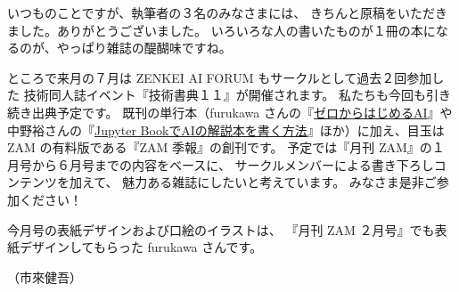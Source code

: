 \documentclass[dvipdfmx,autodetect-engine,10pt,b5paper,papersize,openany,dvipsnames]{jsbook}
\begin{document}
いつものことですが、執筆者の３名のみなさまには、
きちんと原稿をいただきました。ありがとうございました。
いろいろな人の書いたものが１冊の本になるのが、やっぱり雑誌の醍醐味ですね。

\vspace{1em}

ところで来月の７月は ZENKEI AI FORUM もサークルとして過去２回参加した
技術同人誌イベント『技術書典１１』が開催されます。
私たちも今回も引き続き出典予定です。
既刊の単行本（furukawa さんの『\href{https://techbookfest.org/product/6566174659706880}{ゼロからはじめるAI}』や中野裕さんの『\href{https://techbookfest.org/product/5840767786418176}{Jupyter BookでAIの解説本を書く方法}』ほか）に加え、目玉は ZAM の有料版である『ZAM 季報』の創刊です。
予定では『月刊 ZAM』の１月号から６月号までの内容をベースに、
サークルメンバーによる書き下ろしコンテンツを加えて、
魅力ある雑誌にしたいと考えています。
みなさま是非ご参加ください！

\vspace{1em}

今月号の表紙デザインおよび口絵のイラストは、
『月刊 ZAM ２月号』でも表紙デザインしてもらった furukawa さんです。


\begin{flushright}
  （市來健吾）
\end{flushright}
\end{document}
